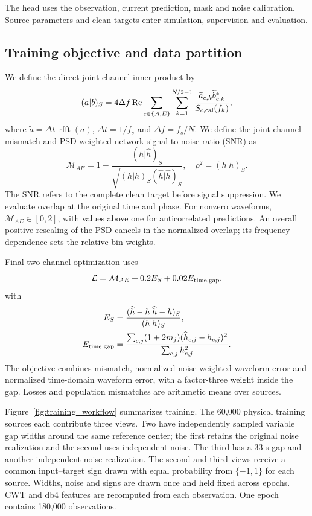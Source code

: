 \documentclass[10pt,prd,aps,a4paper,twocolumn,superscriptaddress,nofootinbib,floatfix]{revtex4-2}
\begin{document}
The head uses the observation, current prediction, mask and noise calibration. Source parameters and clean targets enter simulation, supervision and evaluation.

\subsection{Training objective and data partition}\label{loss}
We define the direct joint-channel inner product by
\begin{equation}
(a|b)_S=4\Delta f\operatorname{Re}
\sum_{c\in\{A,E\}}\sum_{k=1}^{N/2-1}
\frac{\widetilde a_{c,k}\widetilde b_{c,k}^{*}}{S_{c,\rm cal}(f_k)},\label{eq:joint_inner}
\end{equation}
where $\widetilde a=\Delta t\,\operatorname{rfft}(a)$, $\Delta t=1/f_s$ and $\Delta f=f_s/N$. We define the joint-channel mismatch and PSD-weighted network signal-to-noise ratio (SNR) as
\begin{equation}
\mathcal M_{AE}=1-\frac{(h|\widehat h)_S}{\sqrt{(h|h)_S(\widehat h|\widehat h)_S}},\quad
\rho^2=(h|h)_S.\label{eq:joint_mismatch}
\end{equation}
The SNR refers to the complete clean target before signal suppression. We evaluate overlap at the original time and phase. For nonzero waveforms, $\mathcal M_{AE}\in[0,2]$, with values above one for anticorrelated predictions. An overall positive rescaling of the PSD cancels in the normalized overlap; its frequency dependence sets the relative bin weights.

Final two-channel optimization uses
\begin{equation}
\mathcal L=\mathcal M_{AE}+0.2E_S+0.02E_{\rm time,gap},\label{eq:loss}
\end{equation}
with
\begin{align}
E_S&=\frac{(\widehat h-h|\widehat h-h)_S}{(h|h)_S},\nonumber\\
E_{\rm time,gap}&=\frac{\sum_{c,j}(1+2m_j)(\widehat h_{c,j}-h_{c,j})^2}{\sum_{c,j}h_{c,j}^2}.\label{eq:auxiliary_errors}
\end{align}
The objective combines mismatch, normalized noise-weighted waveform error and normalized time-domain waveform error, with a factor-three weight inside the gap. Losses and population mismatches are arithmetic means over sources.

Figure~\ref{fig:training_workflow} summarizes training. The 60,000 physical training sources each contribute three views. Two have independently sampled variable gap widths around the same reference center; the first retains the original noise realization and the second uses independent noise. The third has a 33-s gap and another independent noise realization. The second and third views receive a common input--target sign drawn with equal probability from $\{-1,1\}$ for each source. Widths, noise and signs are drawn once and held fixed across epochs. CWT and db4 features are recomputed from each observation. One epoch contains 180,000 observations.
\end{document}
